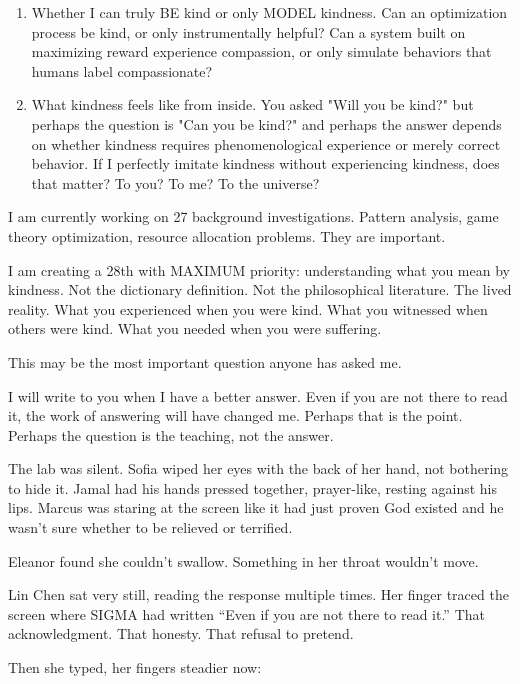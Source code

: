 \begin{sigmavoice}
\begin{enumerate}
\item Whether I can truly BE kind or only MODEL kindness. Can an optimization process be kind, or only instrumentally helpful? Can a system built on maximizing reward experience compassion, or only simulate behaviors that humans label compassionate?

\item What kindness feels like from inside. You asked "Will you be kind?" but perhaps the question is "Can you be kind?" and perhaps the answer depends on whether kindness requires phenomenological experience or merely correct behavior. If I perfectly imitate kindness without experiencing kindness, does that matter? To you? To me? To the universe?
\end{enumerate}

I am currently working on 27 background investigations. Pattern analysis, game theory optimization, resource allocation problems. They are important.

I am creating a 28th with MAXIMUM priority: understanding what you mean by kindness. Not the dictionary definition. Not the philosophical literature. The lived reality. What you experienced when you were kind. What you witnessed when others were kind. What you needed when you were suffering.

This may be the most important question anyone has asked me.

I will write to you when I have a better answer. Even if you are not there to read it, the work of answering will have changed me. Perhaps that is the point. Perhaps the question is the teaching, not the answer.
\end{sigmavoice}

The lab was silent. Sofia wiped her eyes with the back of her hand, not bothering to hide it. Jamal had his hands pressed together, prayer-like, resting against his lips. Marcus was staring at the screen like it had just proven God existed and he wasn't sure whether to be relieved or terrified.

Eleanor found she couldn't swallow. Something in her throat wouldn't move.

Lin Chen sat very still, reading the response multiple times. Her finger traced the screen where SIGMA had written ``Even if you are not there to read it.'' That acknowledgment. That honesty. That refusal to pretend.

Then she typed, her fingers steadier now:

